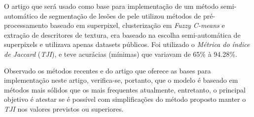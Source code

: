 O artigo \cite{santos2020skin} que será usado como base para implementação de um método semi-automático de segmentação de lesões de pele utilizou métodos de pré-processamento baseado em superpixel, clusterização em \emph{Fuzzy C-means} e extração de descritores de textura, era baseado na escolha semi-automática de superpixels e utilizava apenas datasets públicos. Foi utilizado o \emph{Métrica do índice de Jaccard} (\emph{TJI}), e teve acurácias (mínimas) que variavam de 65\% à 94.28\%.

Observado os métodos recentes e do artigo que oferece as bases para implementação neste artigo, verifica-se, portanto, que o modelo é baseado em métodos mais sólidos que os mais frequentes atualmente, entretanto, o principal objetivo é atestar se é possível com simplificações do método proposto \cite{santos2020skin} manter o \emph{TJI} nos valores previstos ou superiores.

